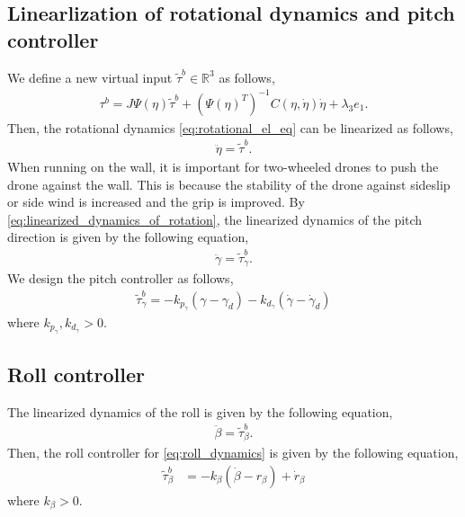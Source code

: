 \subsection{Linearlization of rotational dynamics and pitch controller}
\label{subsec:linearizer_and_pitch_controller}
We define a new virtual input $ \tilde{\tau}^b \in \mathbb{R}^3 $ as follows,
\begin{align}
    \label{eq:vertual_input_of_tau}
    \tau^b = J \Psi(\eta) \tilde{\tau}^b + \left (\Psi(\eta)^T \right )^{-1} C(\eta, \dot{\eta}) \dot{\eta} + \lambda_3 e_1.
\end{align}
Then, the rotational dynamics \eqref{eq:rotational_el_eq} can be linearized as follows,
\begin{align}
    \label{eq:linearized_dynamics_of_rotation}
    \ddot{\eta} = \tilde{\tau}^b.
\end{align}
When running on the wall, it is important for two-wheeled drones to push the drone against the wall.
This is because the stability of the drone against sideslip or side wind is increased and the grip is improved.
By \eqref{eq:linearized_dynamics_of_rotation}, the linearized dynamics of the pitch direction is given by the following equation,
\begin{align}
    \label{eq:linearized_dynamics_of_pitch}
    \ddot{\gamma} = \tilde{\tau}_{\gamma}^b.
\end{align}
We design the pitch controller as follows,
\begin{align}
    \label{eq:controller_of_pitch}
    \tilde{\tau}_{\gamma}^b = - k_{p_{\gamma}} (\gamma - \gamma_d) - k_{d_{\gamma}} (\dot{\gamma} - \dot{\gamma}_d)
\end{align}
where $ k_{p_{\gamma}}, k_{d_{\gamma}} > 0 $.

\subsection{Roll controller}
\label{subsec:controller_of_roll}
The linearized dynamics of the roll is given by the following equation,
\begin{align}
    \label{eq:roll_dynamics}
    \ddot{\beta} = \tilde{\tau}_{\beta}^b.
\end{align}
Then, the roll controller for \eqref{eq:roll_dynamics} is given by the following equation,
\begin{align}
        \tilde{\tau}_{\beta}^b &= - k_{\beta} (\dot{\beta} - r_{\beta}) + \dot{r}_{\beta}
        \label{eq:controller_of_roll}
\end{align}
where $ k_{\beta} > 0 $.

